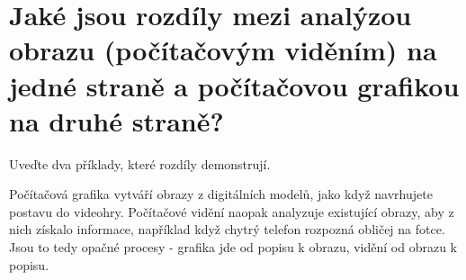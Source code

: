 \section{Jaké jsou rozdíly mezi analýzou obrazu (počítačovým viděním) na jedné straně a počítačovou grafikou na 
druhé straně?}
Uveďte dva příklady, které rozdíly demonstrují.

Počítačová grafika vytváří obrazy z digitálních modelů, jako když navrhujete postavu do videohry. Počítačové vidění 
naopak analyzuje existující obrazy, aby z nich získalo informace, například když chytrý telefon rozpozná obličej na 
fotce. Jsou to tedy opačné procesy - grafika jde od popisu k obrazu, vidění od obrazu k popisu.